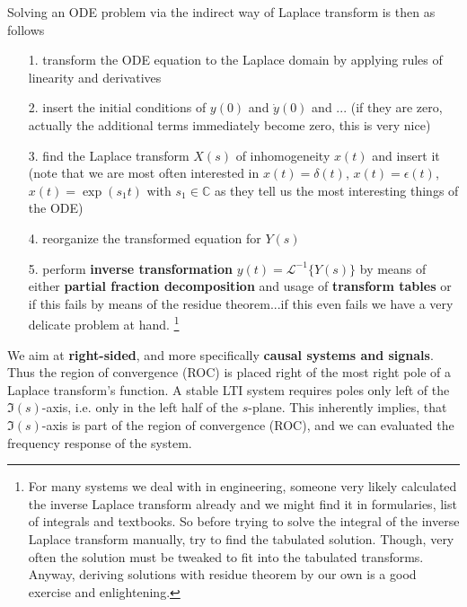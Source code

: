 Solving an ODE problem via the indirect way of Laplace transform is then as follows
\begin{itemize}
\item[1.] transform the ODE equation to the Laplace domain by applying rules of linearity and
derivatives
\item[2.] insert the initial conditions of $y(0)$  and $\dot{y}(0)$ and ...
(if they are zero, actually the additional terms immediately become zero,
this is very nice)
\item[3.] find the Laplace transform $X(s)$ of inhomogeneity $x(t)$ and insert
it (note that we are most often interested in $x(t)=\delta(t)$,
$x(t)=\epsilon(t)$, $x(t)=\exp(s_1 t)$ with $s_1\in\mathbb{C}$
as they tell us the most interesting things of the ODE)
\item[4.] reorganize the transformed equation for $Y(s)$
\item[5.] perform \textbf{inverse transformation} $y(t) = \mathcal{L}^{-1}\{Y(s)\}$
by means of either \textbf{partial fraction decomposition} and usage of
\textbf{transform tables}
or if this fails by means of the residue theorem...if this even fails we have a
very delicate problem at hand.
\footnote{For many systems we deal with in engineering,
someone very likely calculated the inverse Laplace transform already and we
might find it in formularies, list of integrals and textbooks.
So before trying to solve the integral of the inverse Laplace transform
manually, try to find the tabulated solution.
Though, very often the solution must be tweaked to fit into the tabulated
transforms.
Anyway, deriving solutions with residue theorem by our own is a
good exercise and enlightening.}
\end{itemize}

We aim at \textbf{right-sided}, and more specifically \textbf{causal systems and signals}.
Thus the region of convergence (ROC) is placed right of the most right pole of a
Laplace transform's function.
%
A stable LTI system requires poles only left of the $\Im(s)$-axis, i.e. only in
the left half of the $s$-plane.
%
This inherently implies, that $\Im(s)$-axis is part of the region of convergence (ROC),
and we can evaluated the frequency response of the system.

